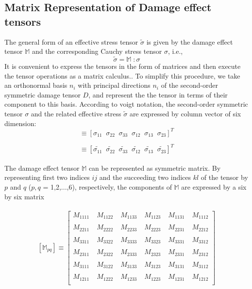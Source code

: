 \documentclass[a4paper,12pt]{extarticle}
\begin{document}
\subsection{Matrix Representation of Damage effect tensors}\label{Matrix Representation of Damage effect tensors}
\indent\indent\indent The general form of an effective stress tensor $\tilde{\sigma}$ is given by the damage effect tensor $\mathbb{M}$ and the corresponding Cauchy stress tensor $\sigma$, i.e.,
\begin{equation}
\tilde{\sigma}  = \mathbb{M} \; :  \sigma 
\label{eqn:effective_stress_tensor} 
\end{equation}
It is convenient to express the tensors in the form of matrices and then execute the tensor operations as a matrix calculus.. To simplify this procedure, we take an orthonormal basis ${n_{i}}$ with principal directions $n_{i}$ of the second-order symmetric damage tensor $D$, and represent the the tensor in terms of their component to this basis. According to voigt notation, the second-order symmetric tensor $\sigma$ and the related effective stress $\tilde{\sigma}$ are expressed by column vector of six dimension:
\begin{equation}
   [\sigma_{P}]  \equiv  [\sigma_{11} \;\; \sigma_{22} \;\;\sigma_{33} \;\;\sigma_{12} \;\;\sigma_{13} \;\;\sigma_{23} ]^{T}
\end{equation}

\begin{equation}
   [\tilde{\sigma_{P}}]  \equiv  [\tilde{\sigma_{11}} \;\; \tilde{\sigma_{22}} \;\;\tilde{\sigma_{33}} \;\;\tilde{\sigma_{12}} \;\;\tilde{\sigma_{13}} \;\;\tilde{\sigma_{23}} ]^{T}
\end{equation}
\\
The damage effect tensor $\mathbb{M}$ can be represented as symmetric matrix. By representing first two indices $ij$ and the succeeding two indices $kl$ of the tensor by $p$ and $q$ ($p,q$ = 1,2,...,6), respectively, the components of $\mathbb{M}$
are expressed by a six by six matrix 
\\
\\
$$
[\mathbb{M}_{pq}] \equiv   
 \begin{bmatrix}
  M_{1111}\; & M_{1122}\; & M_{1133}\; & M_{1123}\; & M_{1131}\; & M_{1112} \\
  \\
  M_{2211}\; & M_{2222}\; & M_{2233}\; & M_{2223}\; & M_{2231}\; & M_{2212} \\
   \\
  M_{3311}\; & M_{3322}\; & M_{3333}\; & M_{3323}\; & M_{3331}\; & M_{3312} \\
   \\
  M_{2311}\; & M_{2322}\; & M_{2333}\; & M_{2323}\; & M_{2331}\; & M_{2312} \\
   \\
  M_{3111}\; & M_{3122}\; & M_{3133}\; & M_{3123}\; & M_{3131}\; & M_{3112} \\
   \\
  M_{1211}\; & M_{1222}\; & M_{1233}\; & M_{1223}\; & M_{1231}\; & M_{1212} 
   \\ 
 \end{bmatrix}
  $$
 \\
\end{document}
